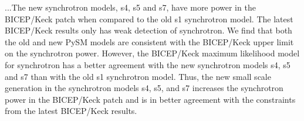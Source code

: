 \documentclass[twocolumn]{aastex631}
\newcommand{\done}{{\tt d1}}
\newcommand{\dnine}{{\tt d9}}
\begin{document}


...The new synchrotron models, s4, s5 and s7, have more power in the BICEP/Keck patch when compared to the old s1 synchrotron model. The latest BICEP/Keck results only has weak detection of synchrotron. We find that both the old and new PySM models are consistent with the BICEP/Keck upper limit on the synchrotron power. However, the BICEP/Keck maximum likelihood model for synchrotron has a better agreement with the new synchrotron models s4, s5 and s7 than with the old s1 synchrotron model. Thus, the new small scale generation in the synchrotron models s4, s5, and s7 increases the synchrotron power in the BICEP/Keck patch and is in better agreement with the constraints from the latest BICEP/Keck results.
\end{document}
